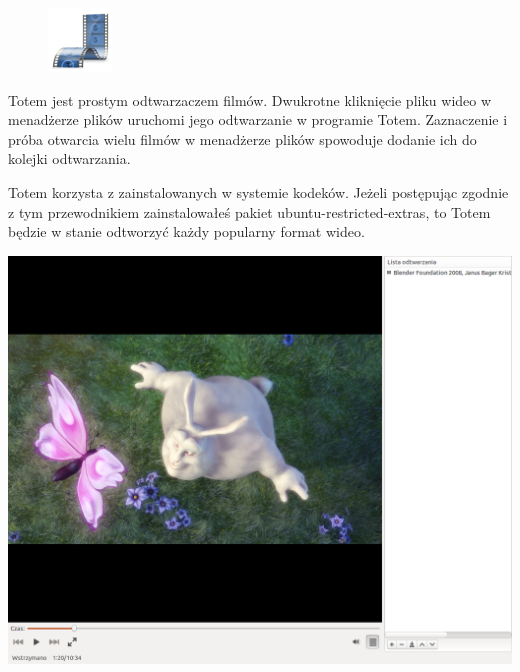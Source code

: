 \begin{figure}
	\vspace{-10pt}
	\includegraphics[width=\linewidth]{images/ikony_totem.png}
\end{figure}

Totem jest prostym odtwarzaczem filmów. Dwukrotne kliknięcie pliku wideo w menadżerze plików uruchomi jego odtwarzanie w programie Totem. Zaznaczenie i próba otwarcia wielu filmów w menadżerze plików spowoduje dodanie ich do kolejki odtwarzania. 

Totem korzysta z zainstalowanych w systemie kodeków. Jeżeli postępując zgodnie z tym przewodnikiem zainstalowałeś pakiet \textcolor{ubuntu_orange}{ubuntu-restricted-extras}, to Totem będzie w stanie odtworzyć każdy popularny format wideo.
\begin{center}
	\includegraphics[width=\linewidth]{images/programy_totem1.png}
\end{center}

